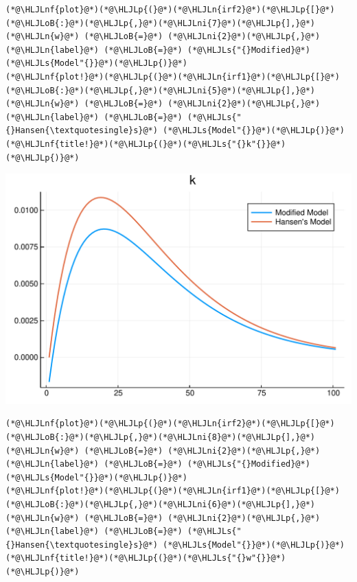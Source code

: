\documentclass[12pt,a4paper]{article}
\newcommand{\HLJLn}[1]{#1}
\newcommand{\HLJLnf}[1]{\textcolor[RGB]{66,102,213}{#1}}
\newcommand{\HLJLs}[1]{\textcolor[RGB]{201,61,57}{#1}}
\newcommand{\HLJLni}[1]{\textcolor[RGB]{59,151,46}{#1}}
\newcommand{\HLJLoB}[1]{\textcolor[RGB]{102,102,102}{\textbf{#1}}}
\newcommand{\HLJLp}[1]{#1}
\begin{document}
\begin{lstlisting}
(*@\HLJLnf{plot}@*)(*@\HLJLp{(}@*)(*@\HLJLn{irf2}@*)(*@\HLJLp{[}@*)(*@\HLJLoB{:}@*)(*@\HLJLp{,}@*)(*@\HLJLni{7}@*)(*@\HLJLp{],}@*) (*@\HLJLn{w}@*) (*@\HLJLoB{=}@*) (*@\HLJLni{2}@*)(*@\HLJLp{,}@*) (*@\HLJLn{label}@*) (*@\HLJLoB{=}@*) (*@\HLJLs{"{}Modified}@*) (*@\HLJLs{Model"{}}@*)(*@\HLJLp{)}@*)
(*@\HLJLnf{plot!}@*)(*@\HLJLp{(}@*)(*@\HLJLn{irf1}@*)(*@\HLJLp{[}@*)(*@\HLJLoB{:}@*)(*@\HLJLp{,}@*)(*@\HLJLni{5}@*)(*@\HLJLp{],}@*) (*@\HLJLn{w}@*) (*@\HLJLoB{=}@*) (*@\HLJLni{2}@*)(*@\HLJLp{,}@*) (*@\HLJLn{label}@*) (*@\HLJLoB{=}@*) (*@\HLJLs{"{}Hansen{\textquotesingle}s}@*) (*@\HLJLs{Model"{}}@*)(*@\HLJLp{)}@*)
(*@\HLJLnf{title!}@*)(*@\HLJLp{(}@*)(*@\HLJLs{"{}k"{}}@*)(*@\HLJLp{)}@*)
\end{lstlisting}

\includegraphics[width=\linewidth]{figures/yvan_9_1.pdf}

\begin{lstlisting}
(*@\HLJLnf{plot}@*)(*@\HLJLp{(}@*)(*@\HLJLn{irf2}@*)(*@\HLJLp{[}@*)(*@\HLJLoB{:}@*)(*@\HLJLp{,}@*)(*@\HLJLni{8}@*)(*@\HLJLp{],}@*) (*@\HLJLn{w}@*) (*@\HLJLoB{=}@*) (*@\HLJLni{2}@*)(*@\HLJLp{,}@*) (*@\HLJLn{label}@*) (*@\HLJLoB{=}@*) (*@\HLJLs{"{}Modified}@*) (*@\HLJLs{Model"{}}@*)(*@\HLJLp{)}@*)
(*@\HLJLnf{plot!}@*)(*@\HLJLp{(}@*)(*@\HLJLn{irf1}@*)(*@\HLJLp{[}@*)(*@\HLJLoB{:}@*)(*@\HLJLp{,}@*)(*@\HLJLni{6}@*)(*@\HLJLp{],}@*) (*@\HLJLn{w}@*) (*@\HLJLoB{=}@*) (*@\HLJLni{2}@*)(*@\HLJLp{,}@*) (*@\HLJLn{label}@*) (*@\HLJLoB{=}@*) (*@\HLJLs{"{}Hansen{\textquotesingle}s}@*) (*@\HLJLs{Model"{}}@*)(*@\HLJLp{)}@*)
(*@\HLJLnf{title!}@*)(*@\HLJLp{(}@*)(*@\HLJLs{"{}w"{}}@*)(*@\HLJLp{)}@*)
\end{lstlisting}
\end{document}
